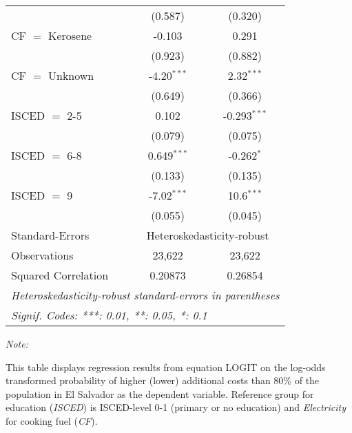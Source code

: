 \begin{table}[htbp!]
\begin{adjustbox}{width = 1\textwidth, max height = 0.95\textheight, center}
\begin{threeparttable}[b]
\begin{tabular}{lcc}
                                 & (0.587)       & (0.320)\\   
            CF $=$ Kerosene      & -0.103        & 0.291\\   
                                 & (0.923)       & (0.882)\\   
            CF $=$ Unknown       & -4.20$^{***}$ & 2.32$^{***}$\\   
                                 & (0.649)       & (0.366)\\   
            ISCED $=$ 2-5        & 0.102         & -0.293$^{***}$\\   
                                 & (0.079)       & (0.075)\\   
            ISCED $=$ 6-8        & 0.649$^{***}$ & -0.262$^{*}$\\   
                                 & (0.133)       & (0.135)\\   
            ISCED $=$ 9          & -7.02$^{***}$ & 10.6$^{***}$\\   
                                 & (0.055)       & (0.045)\\   
            \midrule 
            Standard-Errors & \multicolumn{2}{c}{Heteroskedasticity-robust} \\ 
            Observations         & 23,622        & 23,622\\  
            Squared Correlation  & 0.20873       & 0.26854\\  
            \midrule \midrule
            \multicolumn{3}{l}{\emph{Heteroskedasticity-robust standard-errors in parentheses}}\\
            \multicolumn{3}{l}{\emph{Signif. Codes: ***: 0.01, **: 0.05, *: 0.1}}\\
         \end{tabular}
         
         \begin{tablenotes}\item \medskip \textit{Note:}
            \item This table displays regression results from equation LOGIT on the log-odds transformed probability of higher (lower) additional costs than 80\% of the population in El Salvador as the dependent variable. Reference group for education (\textit{ISCED}) is ISCED-level 0-1 (primary or no education) and \textit{Electricity} for cooking fuel (\textit{CF}).
         \end{tablenotes}
      \end{threeparttable}
   \end{adjustbox}
\end{table}


